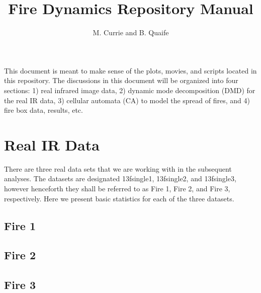 \documentclass{article}
\begin{document}
\title{Fire Dynamics Repository Manual}
\author{M. Currie and B. Quaife}
\maketitle

\abstract

This document is meant to make sense of the plots, movies, and scripts located in this repository. The discussions in this document will be organized into four sections: 1) real infrared image data, 2) dynamic mode decomposition (DMD) for the real IR data, 3)  cellular automata (CA) to model the spread of fires, and 4) fire box data, results, etc.

\section{Real IR Data}
There are three real data sets that we are working with in the subsequent analyses. The datasets are designated 13fsingle1, 13fsingle2, and 13fsingle3, however henceforth they shall be referred to as Fire 1, Fire 2, and Fire 3, respectively. Here we present basic statistics for each of the three datasets. 

\subsection{Fire 1}

\subsection{Fire 2}

\subsection{Fire 3}
\end{document}
